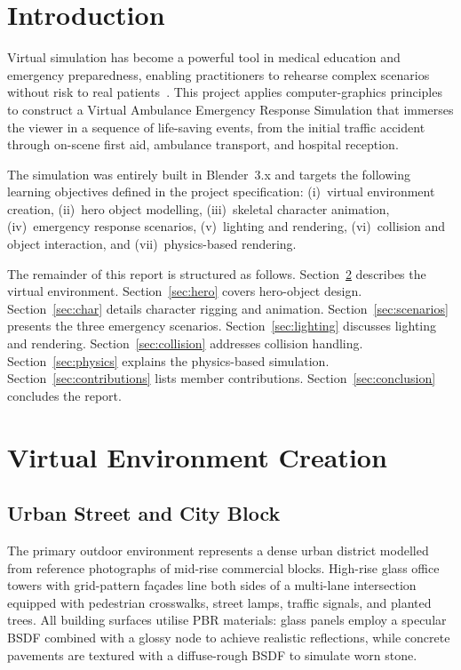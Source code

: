 \documentclass[10pt, twocolumn]{article}
\begin{document}
\section{Introduction}

Virtual simulation has become a powerful tool in medical education and emergency
preparedness, enabling practitioners to rehearse complex scenarios without risk to
real patients~\cite{caballero2018, lu2021}.
This project applies computer-graphics principles to construct a Virtual Ambulance
Emergency Response Simulation that immerses the viewer in a sequence of
life-saving events, from the initial traffic accident through on-scene first aid,
ambulance transport, and hospital reception.

The simulation was entirely built in Blender~3.x and targets the following learning
objectives defined in the project specification:
(i)~virtual environment creation,
(ii)~hero object modelling,
(iii)~skeletal character animation,
(iv)~emergency response scenarios,
(v)~lighting and rendering,
(vi)~collision and object interaction, and
(vii)~physics-based rendering.

The remainder of this report is structured as follows.
Section~\ref{sec:env} describes the virtual environment.
Section~\ref{sec:hero} covers hero-object design.
Section~\ref{sec:char} details character rigging and animation.
Section~\ref{sec:scenarios} presents the three emergency scenarios.
Section~\ref{sec:lighting} discusses lighting and rendering.
Section~\ref{sec:collision} addresses collision handling.
Section~\ref{sec:physics} explains the physics-based simulation.
Section~\ref{sec:contributions} lists member contributions.
Section~\ref{sec:conclusion} concludes the report.

\section{Virtual Environment Creation}
\label{sec:env}

\subsection{Urban Street and City Block}

The primary outdoor environment represents a dense urban district modelled from
reference photographs of mid-rise commercial blocks.
High-rise glass office towers with grid-pattern façades line both sides of a
multi-lane intersection equipped with pedestrian crosswalks, street lamps, traffic
signals, and planted trees.
All building surfaces utilise PBR materials: glass panels employ a specular BSDF
combined with a glossy node to achieve realistic reflections, while concrete pavements
are textured with a diffuse-rough BSDF to simulate worn stone.
\end{document}
